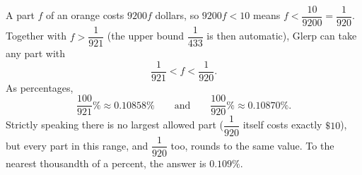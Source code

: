 A part $f$ of an orange costs $9200f$ dollars, so $9200f<10$ means $f<\dfrac{10}{9200}=\dfrac{1}{920}$. Together with $f>\dfrac1{921}$ (the upper bound $\dfrac1{433}$ is then automatic), Glerp can take any part with
\[\dfrac{1}{921}<f<\dfrac{1}{920}.\]
As percentages,
\[\dfrac{100}{921}\%\approx0.10858\%\qquad\text{and}\qquad\dfrac{100}{920}\%\approx0.10870\%.\]
Strictly speaking there is no largest allowed part ($\dfrac1{920}$ itself costs exactly $\$10$), but every part in this range, and $\dfrac1{920}$ too, rounds to the same value. To the nearest thousandth of a percent, the answer is $\boxed{0.109\%}$.
